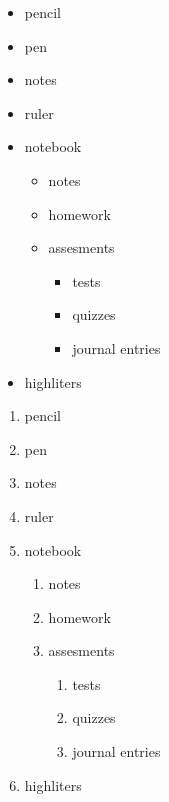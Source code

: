 \documentclass[11pt]{article}
\begin{document}
\vspace{1cm}

\begin{itemize}
\item pencil
\item pen
\item notes
\item ruler
\item notebook
	\begin{itemize}
	\item notes
	\item homework
	\item assesments
		\begin{itemize}
		\item tests
		\item quizzes
		\item journal entries
		\end{itemize}
	\end{itemize}
\item highliters
\end{itemize}

\vspace{1cm}

\begin{enumerate}
\item[] pencil
\item[] pen
\item[] notes
\item[] ruler
\item[] notebook
	\begin{enumerate}
	\item[] notes
	\item[] homework
	\item[] assesments
		\begin{enumerate}
		\item[] tests
		\item[] quizzes
		\item[] journal entries
		\end{enumerate}
	\end{enumerate}
\item[] highliters
\end{enumerate}

\vspace{1cm}
\end{document}
